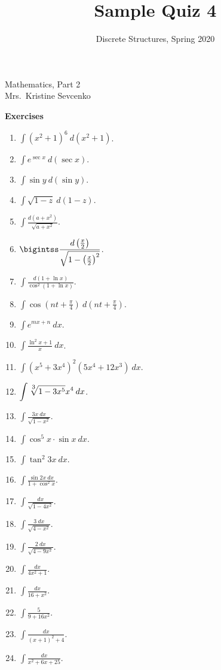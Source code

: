 \documentclass[jou]{apa6}
\title{Sample Quiz 4}
\author{Discrete Structures, Spring 2020}
\affiliation{RBS}
\begin{document}
\thispagestyle{empty}

\twocolumn

\begin{center}
{\Large Mathematics, Part 2}\\
{\large Mrs.\ Kristine Sevcenko}
\end{center}

{\large
{\bf Exercises}

\begin{enumerate}[1)]
\item ${\displaystyle \int \left(x^2+1 \right)^6\:d\left(x^2 + 1\right)}$.
\item ${\displaystyle \int e^{\sec x}\:d(\sec x)}$.
\item ${\displaystyle \int \sin y\:d(\sin y)}$.
\item ${\displaystyle \int \sqrt{1 - z}\:d(1-z)}$.
\item ${\displaystyle \int \frac{d(a+x^2)}{\sqrt{a + x^2}}}$.
\item ${\displaystyle \bigintss \frac{d\left(\frac{x}{2}\right)}{\sqrt{1 - \left(\frac{x}{2}\right)^2}}}$.
\item ${\displaystyle \int \frac{d(1 + \ln x)}{\cos^2 (1 + \ln x)}}$.
\item ${\displaystyle \int \cos \left( nt + \frac{\pi}{4} \right)\:d\left( nt + \frac{\pi}{4} \right)}$.
\item ${\displaystyle \int e^{mx+n}\:dx}$.
\item ${\displaystyle \int \frac{\ln^{2}x + 1}{x}\:dx}$.

\item ${\displaystyle \int \left(x^5 + 3x^4\right)^2\left(5x^4 + 12x^3\right)\:dx}$.
\item ${\displaystyle \int  \sqrt[\leftroot{-1}\uproot{2}\scriptstyle 3]{1 - 3x^5}x^4\:dx}$.
\item ${\displaystyle \int \frac{3x\:dx}{\sqrt{1 - x^2}}}$.
\item ${\displaystyle \int \cos^5 x \cdot \sin x\:dx}$.
\item ${\displaystyle \int \tan^2 3x\:dx}$.
\item ${\displaystyle \int \frac{\sin 2x\:dx}{1 + \cos^2 x}}$.
\item ${\displaystyle \int \frac{dx}{\sqrt{1 - 4x^2}}}$.
\item ${\displaystyle \int \frac{3\:dx}{\sqrt{4 - x^2}}}$.
\item ${\displaystyle \int \frac{2\:dx}{\sqrt{4 - 9x^2}}}$.
\item ${\displaystyle \int \frac{dx}{4x^2 + 1}}$.

\item ${\displaystyle \int \frac{dx}{16 + x^2}}$.
\item ${\displaystyle \int \frac{5}{9 + 16x^2}}$.
\item ${\displaystyle \int \frac{dx}{(x+1)^2 + 4}}$.
\item ${\displaystyle \int \frac{dx}{x^2 + 6x + 25}}$.
\end{enumerate}

}
\end{document}
